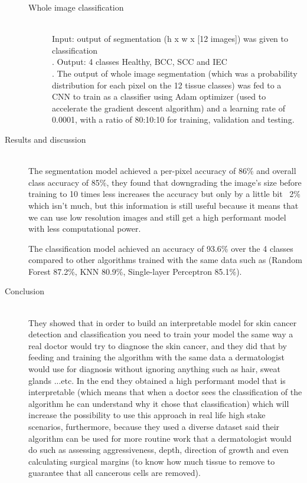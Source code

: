 \begin{description}
\begin{description}
    \item[Whole image classification] \hfill \\

        Input: output of segmentation (h x w x [12 images]) was given to classification \hfill \\.
        Output: 4 classes Healthy, BCC, SCC and IEC \hfill \\.
        The output of whole image segmentation (which was a probability distribution for each pixel on the 12 tissue classes) was fed to a CNN to train as a classifier using Adam optimizer (used to accelerate the gradient descent algorithm) and a learning rate of 0.0001, with a ratio of 80:10:10 for training, validation and testing.
    \end{description}


\item[Results and discussion] \hfill \\
    The segmentation model achieved a per-pixel accuracy of 86\% and overall class accuracy of 85\%, they found that downgrading the image's size before training to 10 times less increases the accuracy but only by a little bit ~2\% which isn't much, but this information is still useful because it means that we can use low resolution images and still get a high performant model with less computational power.

    The classification model achieved an accuracy of 93.6\% over the 4 classes compared to other algorithms trained with the same data such as (Random Forest 87.2\%, KNN 80.9\%, Single-layer Perceptron 85.1\%).


\item[Conclusion] \hfill \\
    They showed that in order to build an interpretable model for skin cancer detection and classification you need to train your model the same way a real doctor would try to diagnose the skin cancer, and they did that by feeding and training the algorithm with the same data a dermatologist would use for diagnosis without ignoring anything such as hair, sweat glands ...etc. In the end they obtained a high performant model that is interpretable (which means that when a doctor sees the classification of the algorithm he can understand why it chose that classification) which will increase the possibility to use this approach in real life high stake scenarios, furthermore, because they used a diverse dataset said their algorithm can be used for more routine work that a dermatologist would do such as assessing aggressiveness, depth, direction of growth and even calculating surgical margins (to know how much tissue to remove to guarantee that all cancerous cells are removed).
\end{description}



